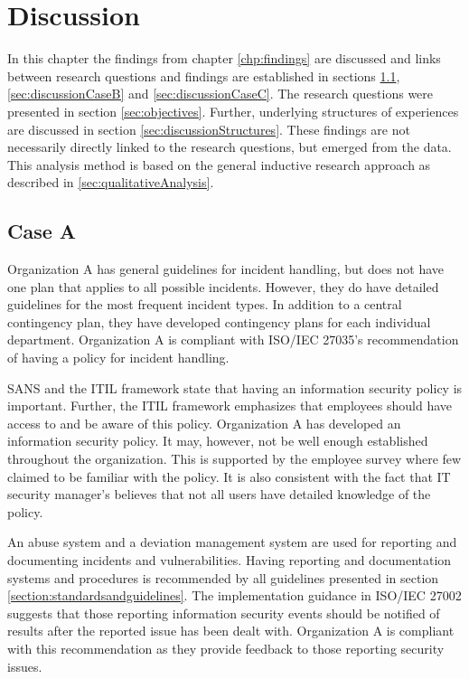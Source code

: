 \chapter{Discussion}
\label{chp:discussion}
In this chapter the findings from chapter \ref{chp:findings} are discussed and links between research questions and findings are established in sections \ref{sec:discussionCaseA}, \ref{sec:discussionCaseB} and \ref{sec:discussionCaseC}. The research questions were presented in section \ref{sec:objectives}. Further, underlying structures of experiences  are discussed in section \ref{sec:discussionStructures}. These findings are not necessarily  directly linked to the research questions, but emerged from the data. This analysis method is based on the general inductive research approach as described in \ref{sec:qualitativeAnalysis}.  

\section{Case A}
\label{sec:discussionCaseA}
Organization A has general guidelines for incident handling, but does not have one plan that applies to all possible incidents. However, they do have detailed guidelines for the most frequent incident types. In addition to a central contingency plan, they have developed contingency plans for each individual department. Organization A is compliant with ISO/IEC 27035's recommendation of having a policy for incident handling.

SANS and the \acs{ITIL} framework state that having an information security policy is important. Further, the \acs{ITIL} framework emphasizes that employees should have access to and be aware of this policy. Organization A has developed an information security policy. It may, however, not be well enough established throughout the organization. This is supported by the employee survey where few claimed to be familiar with the policy. It is also consistent with the fact that IT security manager's believes that not all users have detailed knowledge of the policy. 

An abuse system and a deviation management system are used for reporting and documenting incidents and vulnerabilities. Having reporting and documentation systems and procedures is recommended by all guidelines presented in section \ref{section:standardsandguidelines}.   The implementation guidance in ISO/IEC 27002 suggests that those reporting information security events should be notified of results after the reported issue has been dealt with. Organization A is compliant with this recommendation as they provide feedback to those reporting security issues. 

